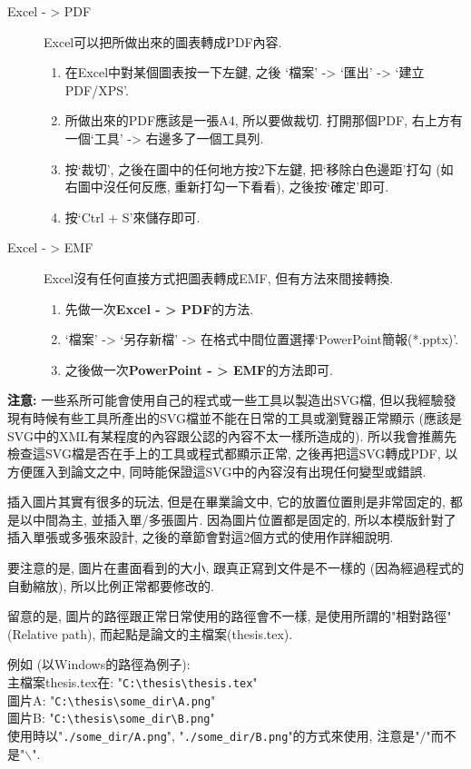 \begin{description}
  \item[Excel - > PDF] Excel可以把所做出來的圖表轉成PDF內容. 
    \begin{enumerate}
      \item 在Excel中對某個圖表按一下左鍵, 之後 `檔案' -> `匯出' -> `建立PDF/XPS'.
      \item 所做出來的PDF應該是一張A4, 所以要做裁切. 打開那個PDF, 右上方有一個`工具' -> 右邊多了一個工具列.
      \item 按`裁切', 之後在圖中的任何地方按2下左鍵, 把`移除白色邊距'打勾 (如右圖中沒任何反應, 重新打勾一下看看), 之後按`確定'即可.
      \item 按`Ctrl + S'來儲存即可.
    \end{enumerate}

  \item[Excel - > EMF] Excel沒有任何直接方式把圖表轉成EMF, 但有方法來間接轉換.
    \begin{enumerate}
      \item 先做一次\textbf{Excel - > PDF}的方法.
      \item `檔案' -> `另存新檔' -> 在格式中間位置選擇`PowerPoint簡報(*.pptx)'.
      \item 之後做一次\textbf{PowerPoint - > EMF}的方法即可.
    \end{enumerate}
\end{description}

\noindent \textbf{注意:} 一些系所可能會使用自己的程式或一些工具以製造出SVG檔, 但以我經驗發現有時候有些工具所產出的SVG檔並不能在日常的工具或瀏覽器正常顯示 (應該是SVG中的XML有某程度的內容跟公認的內容不太一樣所造成的). 所以我會推薦先檢查這SVG檔是否在手上的工具或程式都顯示正常, 之後再把這SVG轉成PDF, 以方便匯入到論文之中, 同時能保證這SVG中的內容沒有出現任何變型或錯誤.

\newpage
{}

插入圖片其實有很多的玩法, 但是在畢業論文中, 它的放置位置則是非常固定的, 都是以中間為主, 並插入單/多張圖片. 因為圖片位置都是固定的, 所以本模版針對了插入單張或多張來設計, 之後的章節會對這2個方式的使用作詳細說明.

要注意的是, 圖片在畫面看到的大小, 跟真正寫到文件是不一樣的 (因為經過程式的自動縮放), 所以比例正常都要修改的.

留意的是, 圖片的路徑跟正常日常使用的路徑會不一樣, 是使用所謂的"相對路徑" (Relative path), 而起點是論文的主檔案(thesis.tex).

\noindent 例如 (以Windows的路徑為例子):\\
主檔案thesis.tex在: "\verb|C:\thesis\thesis.tex|"\\
圖片A: "\verb|C:\thesis\some_dir\A.png|"\\
圖片B: "\verb|C:\thesis\some_dir\B.png|"\\
使用時以"\verb|./some_dir/A.png|", "\verb|./some_dir/B.png|"的方式來使用, 注意是"$/$"而不是"$\backslash$".

